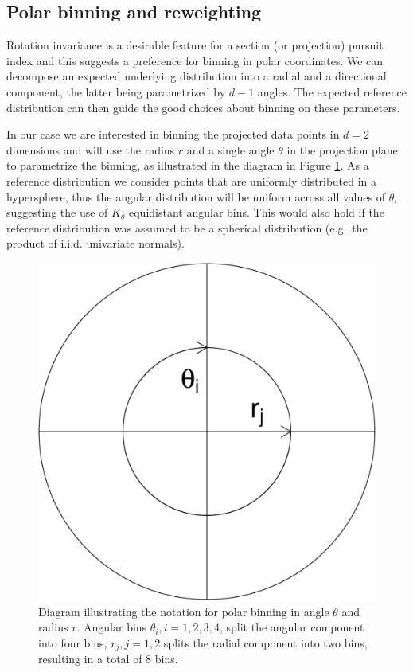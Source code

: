 \documentclass[]{interact}
\theoremstyle{plain}%
\theoremstyle{definition}
\theoremstyle{remark}
\begin{document}
\hypertarget{polar-binning-and-reweighting}{%
\subsection{\texorpdfstring{Polar binning and reweighting
\label{sec:binning}}{Polar binning and reweighting }}\label{polar-binning-and-reweighting}}

Rotation invariance is a desirable feature for a section (or projection)
pursuit index and this suggests a preference for binning in polar
coordinates. We can decompose an expected underlying distribution into a
radial and a directional component, the latter being parametrized by
\(d-1\) angles. The expected reference distribution can then guide the
good choices about binning on these parameters.

In our case we are interested in binning the projected data points in
\(d=2\) dimensions and will use the radius \(r\) and a single angle
\(\theta\) in the projection plane to parametrize the binning, as
illustrated in the diagram in Figure \ref{fig:sketch}. As a reference
distribution we consider points that are uniformly distributed in a
hypersphere, thus the angular distribution will be uniform across all
values of \(\theta\), suggesting the use of \(K_{\theta}\) equidistant
angular bins. This would also hold if the reference distribution was
assumed to be a spherical distribution (e.g.~the product of i.i.d.
univariate normals).

\begin{figure}

{\centering \includegraphics[width=0.3\linewidth]{section_pursuit_files/figure-latex/sketch-1} 

}

\caption{Diagram illustrating the notation for polar binning in angle $\theta$ and radius $r$. Angular bins $\theta_i, i=1, 2, 3, 4$, split the angular component into four bins, $r_j, j=1, 2$ splits the radial component into two bins, resulting in a total of 8 bins.}\label{fig:sketch}
\end{figure}
\end{document}
